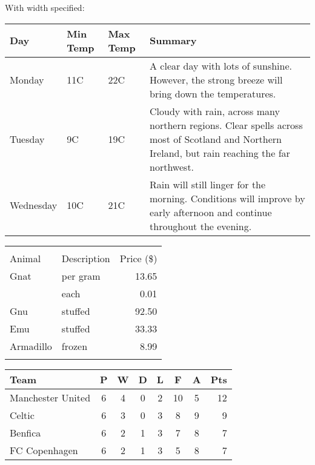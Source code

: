 With width specified:
\begin{center}
    \begin{tabular}{ | l | l | l | p{5cm} |}
    \hline
    Day & Min Temp & Max Temp & Summary \\ \hline
    Monday & 11C & 22C & A clear day with lots of sunshine.  
    However, the strong breeze will bring down the temperatures. \\ \hline
    Tuesday & 9C & 19C & Cloudy with rain, across many northern regions. Clear spells
    across most of Scotland and Northern Ireland,
    but rain reaching the far northwest. \\ \hline
    Wednesday & 10C & 21C & Rain will still linger for the morning.
    Conditions will improve by early afternoon and continue
    throughout the evening. \\
    \hline
    \end{tabular}
\end{center}

\begin{tabular}{ | l | l | r | }
  \hline\noalign{\smallskip}
  \multicolumn{2}{c}{Item} \\
  \cline{1-2}\noalign{\smallskip}
  Animal & Description & Price (\$) \\
  \noalign{\smallskip}\hline\noalign{\smallskip}
  Gnat  & per gram & 13.65 \\
        & each     &  0.01 \\
  Gnu   & stuffed  & 92.50 \\
  Emu   & stuffed  & 33.33 \\
  Armadillo & frozen & 8.99 \\
  \noalign{\smallskip}\hline
\end{tabular}

\begin{tabular}{l*{6}{c}r}
Team              & P & W & D & L & F  & A & Pts \\
\hline
Manchester United & 6 & 4 & 0 & 2 & 10 & 5 & 12  \\
Celtic            & 6 & 3 & 0 & 3 &  8 & 9 &  9  \\
Benfica           & 6 & 2 & 1 & 3 &  7 & 8 &  7  \\
FC Copenhagen     & 6 & 2 & 1 & 3 &  5 & 8 &  7  \\
\end{tabular}

